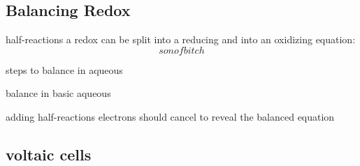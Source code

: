 \begin{mdframed}
\begin{multicols}{2}
\subsection{Balancing Redox}
\begin{compactdesc}
    \item[half-reactions] a redox can be split into a reducing and into an
        oxidizing equation:
        \[
            son of bitch
        \]
    \item[steps to balance in aqueous]
        \begin{compactenum}
        \item
        \end{compactenum}
    \item[balance in basic aqueous]
    \item[adding half-reactions] electrons should cancel to reveal the
        balanced equation
\end{compactdesc}
\end{multicols}
\end{mdframed}






\begin{mdframed}
\begin{multicols}{2}
\subsection{voltaic cells}
\begin{compactdesc}
    \item[]
    \item[]
    \item[]
    \item[]
    \item[]
\end{compactdesc}
\end{multicols}
\end{mdframed}






